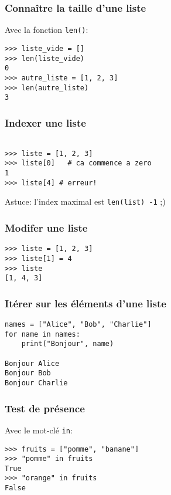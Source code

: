 \documentclass{beamer}
\begin{document}
\begin{frame}[fragile]
  \frametitle{Connaître la taille d'une liste}
Avec la fonction \texttt{len()}:

\vfill

\begin{lstlisting}
>>> liste_vide = []
>>> len(liste_vide)
0
>>> autre_liste = [1, 2, 3]
>>> len(autre_liste)
3
\end{lstlisting}

\end{frame}



\begin{frame}[fragile]
  \frametitle{Indexer une liste}

\begin{lstlisting}

>>> liste = [1, 2, 3]
>>> liste[0]   # ca commence a zero
1
>>> liste[4] # erreur!
\end{lstlisting}

\vfill

Astuce: l'index maximal est \texttt{len(list) -1} ;)

\end{frame}

\begin{frame}[fragile]
  \frametitle{Modifer une liste}
\begin{lstlisting}
>>> liste = [1, 2, 3]
>>> liste[1] = 4
>>> liste
[1, 4, 3]
\end{lstlisting}

\end{frame}

\begin{frame}[fragile]
  \frametitle{Itérer sur les éléments d'une liste}
\begin{lstlisting}
names = ["Alice", "Bob", "Charlie"]
for name in names:
    print("Bonjour", name)

Bonjour Alice
Bonjour Bob
Bonjour Charlie
\end{lstlisting}

\end{frame}

\begin{frame}[fragile]
  \frametitle{Test de présence}

Avec le mot-clé \texttt{in}:

\vfill

\begin{lstlisting}
>>> fruits = ["pomme", "banane"]
>>> "pomme" in fruits
True
>>> "orange" in fruits
False
\end{lstlisting}

\end{frame}
\end{document}
